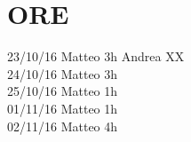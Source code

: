 
\section{ORE}
23/10/16 
Matteo 3h 
Andrea XX\\
24/10/16 
Matteo 3h\\
25/10/16 
Matteo 1h\\
01/11/16
Matteo 1h\\
02/11/16
Matteo 4h\\
